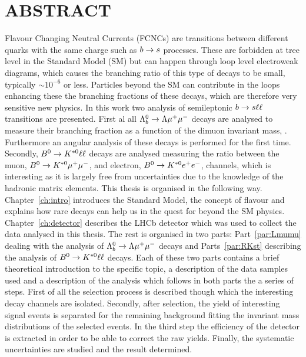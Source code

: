 \chapter*{ABSTRACT}
%
Flavour Changing Neutral Currents (FCNCs) are transitions between different quarks with the same charge such as $b\rightarrow s$ processes. These are forbidden at tree level in the Standard Model (SM) but
can happen through loop level electroweak diagrams, which causes the branching ratio of this type of decays
to be small, typically $\sim 10^{-6}$ or less. Particles beyond the SM can contribute in the loops enhancing
these the branching fractions of these decays, which are therefore very sensitive new physics.
In this work two analysis of semileptonic $b\rightarrow s\ell\ell$ transitions are presented.
First al all $\Lambda^0_b\rightarrow\Lambda\mu^+\mu^-$ decays are analysed to measure their branching fraction as a function
of the dimuon invariant mass, \qsq. Furthermore an angular analysis of these decays is performed for the first time. Secondly, $B^0\rightarrow K^{*0}\ell\ell$ decays are analysed measuring the ratio between the muon, $B^0\rightarrow K^{*0}\mu^+\mu^-$, and electron, $B^0\rightarrow K^{*0}e^+ e^-$, channels, which is interesting as it is largely free
from uncertainties due to the knowledge of the hadronic matrix elements.
This thesis is organised in the following way. Chapter~\ref{ch:intro} introduces the Standard Model,
the concept of flavour and explains how rare decays can help us in the quest for beyond the SM physics.
Chapter~\ref{ch:detector} describes the LHCb detector which was used to collect the data analysed in this thesis. The rest is organised in two parts: Part~\ref{par:Lmumu} dealing with the analysis of $\Lambda^0_b\rightarrow\Lambda\mu^+\mu^-$ 
decays and Parts~\ref{par:RKst} describing the analysis of $B^0\rightarrow K^{*0}\ell\ell$ decays.
Each of these two parts contains a brief theoretical introduction to the specific topic, a description of the
data samples used and a description of the analysis which follows in both parts the a series of steps.
First of all the selection process is described though which the interesting decay channels are isolated.
Secondly, after selection, the yield of interesting signal events is separated for the remaining background
fitting the invariant mass distributions of the selected events. In the third step the efficiency of the detector
is extracted in order to be able to correct the raw yields. Finally, the systematic uncertainties are studied and
the result determined.
%
\clearpage

